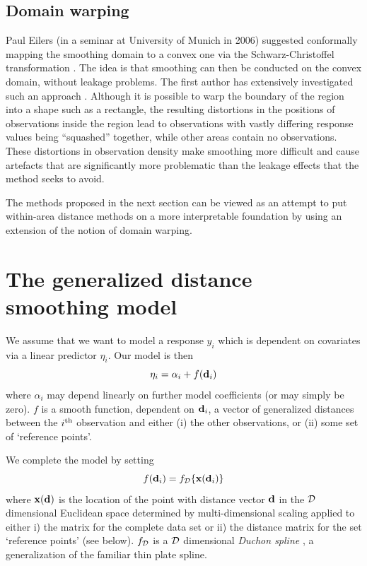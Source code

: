 \documentclass[smallextended]{svjour3}       %
\begin{document}
\subsection{Domain warping}

Paul Eilers (in a seminar at University of Munich in 2006) suggested conformally mapping the smoothing domain to a convex one  via the Schwarz-Christoffel transformation \citep{Driscoll:2002tq}. The idea is that smoothing can then be conducted on the convex domain, without leakage problems. The first author has extensively investigated such an approach \citep[Chapter 3]{Miller:2012wy}. Although it is possible to warp the boundary of the region into a shape such as a rectangle, the resulting distortions in the positions of observations inside the region lead to observations with vastly differing response values being ``squashed'' together, while other areas contain no observations. These distortions in observation density make smoothing more difficult and cause artefacts that are significantly more problematic than the leakage effects that the method seeks to avoid. 

The methods proposed in the next section can be viewed as an attempt to put within-area distance methods on a more interpretable foundation by using an extension of the notion of domain warping. 


\section{The generalized distance smoothing model}
\label{proposed-model}

We assume that we want to model a response $y_i$ which is dependent on covariates via a linear predictor $\eta_i$. Our model is then
$$
\eta_i = \alpha_i + f({\bf d}_i)
$$
where $\alpha_i$ may depend linearly on further model coefficients (or may simply be zero). $f$ is a smooth function, dependent on ${\bf d}_i$, a vector of generalized distances between the $i^{\rm th}$ observation and either (i) the other observations, or (ii) some set of `reference points'. 

We complete the model by setting 
$$
f({\bf d}_i) = f_{\cal D}\{{\bf x}({\bf d}_i)\}
$$
where ${\bf x}({\bf d})$ is the location of the point with distance vector $\bf d$ in the $\cal D$ dimensional 
Euclidean space determined by multi-dimensional scaling applied to either i) the matrix for the complete data set or ii) the distance matrix for the set `reference points' (see below). $f_{\cal D}$ is a $\cal D$ dimensional \textit{Duchon spline} \citep{Duchon:1977tr}, a generalization of the familiar thin plate spline. 
\end{document}
